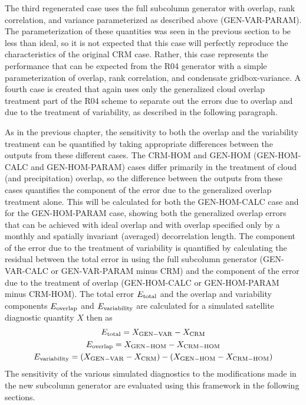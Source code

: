 The third regenerated case uses the full subcolumn generator with overlap, rank correlation, and variance parameterized as described above (GEN-VAR-PARAM). The parameterization of these quantities was seen in the previous section to be less than ideal, so it is not expected that this case will perfectly reproduce the characteristics of the original CRM case. Rather, this case represents the performance that can be expected from the R04 generator with a simple parameterization of overlap, rank correlation, and condensate gridbox-variance. A fourth case is created that again uses only the generalized cloud overlap treatment part of the R04 scheme to separate out the errors due to overlap and due to the treatment of variability, as described in the following paragraph.

As in the previous chapter, the sensitivity to both the overlap and the variability treatment can be quantified by taking appropriate differences between the outputs from these different cases. The CRM-HOM and GEN-HOM (GEN-HOM-CALC and GEN-HOM-PARAM) cases differ primarily in the treatment of cloud (and precipitation) overlap, so the difference between the outputs from these cases quantifies the component of the error due to the generalized overlap treatment alone. This will be calculated for both the GEN-HOM-CALC case and for the GEN-HOM-PARAM case, showing both the generalized overlap errors that can be achieved with ideal overlap and with overlap specified only by a monthly and spatially invariant (averaged) decorrelation length. The component of the error due to the treatment of variability is quantified by calculating the residual between the total error in using the full subcolumn generator (GEN-VAR-CALC or GEN-VAR-PARAM minus CRM) and the component of the error due to the treatment of overlap (GEN-HOM-CALC or GEN-HOM-PARAM minus CRM-HOM). The total error $E_{\rm total}$ and the overlap and variability components $E_{\rm overlap}$ and $E_{\rm variability}$ are calculated for a simulated satellite diagnostic quantity $X$ then as
\begin{gather}
E_{\rm total} = X_{\rm GEN-VAR} - X_{\rm CRM} \\
E_{\rm overlap} = X_{\rm GEN-HOM} - X_{\rm CRM-HOM} \\
E_{\rm variability} = (X_{\rm GEN-VAR} - X_{\rm CRM}) - (X_{\rm GEN-HOM} - X_{\rm CRM-HOM})
\end{gather}
The sensitivity of the various simulated diagnostics to the modifications made in the new subcolumn generator are evaluated using this framework in the following sections.

